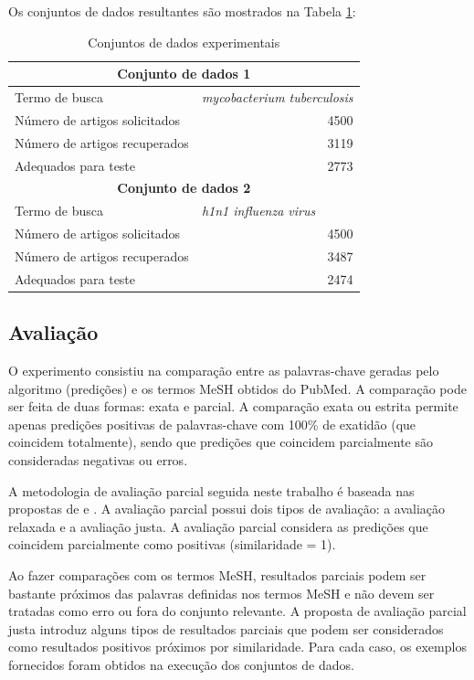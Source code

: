 Os conjuntos de dados resultantes são mostrados na Tabela \ref{tab:datasetsTeste}:

\begin{table}[htbp]
\center
\begin{tabular}{|l|r|}
\hline
\multicolumn{ 2}{|c|}{\textbf{Conjunto de dados 1}} \\ \hline
Termo de busca & \multicolumn{1}{l|}{\textit{mycobacterium tuberculosis}} \\ \hline
Número de artigos solicitados & 4500 \\ \hline
Número de artigos recuperados & 3119 \\ \hline
Adequados para teste & 2773 \\ \hline
\multicolumn{ 2}{|c|}{\textbf{Conjunto de dados 2}} \\ \hline
Termo de busca & \multicolumn{1}{l|}{\textit{h1n1 influenza virus}} \\ \hline
Número de artigos solicitados & 4500 \\ \hline
Número de artigos recuperados & 3487 \\ \hline
Adequados para teste & 2474 \\ \hline
\end{tabular}
\caption{Conjuntos de dados experimentais}
\label{tab:datasetsTeste}
\end{table}

\subsection{Avaliação}
O experimento consistiu na comparação entre as palavras-chave geradas pelo algoritmo (predições) e os termos MeSH obtidos do PubMed. A comparação pode ser feita de duas formas: exata e parcial. A comparação exata ou estrita permite apenas predições positivas de palavras-chave com 100\% de exatidão (que coincidem totalmente), sendo que predições que coincidem parcialmente são consideradas negativas ou erros. 

A metodologia de avaliação parcial seguida neste trabalho é baseada nas propostas de \cite{Chinchor1995} e \cite{Tsai2006}. A avaliação parcial possui dois tipos de avaliação: a avaliação relaxada e a avaliação justa. A avaliação parcial considera as predições que coincidem parcialmente como positivas (similaridade = 1).

Ao fazer comparações com os termos MeSH, resultados parciais podem ser bastante próximos das palavras definidas nos termos MeSH e não devem ser tratadas como erro ou fora do conjunto relevante. A proposta de avaliação parcial justa introduz alguns tipos de resultados parciais que podem ser considerados como resultados positivos próximos por similaridade. Para cada caso, os exemplos fornecidos foram obtidos na execução dos conjuntos de dados.

